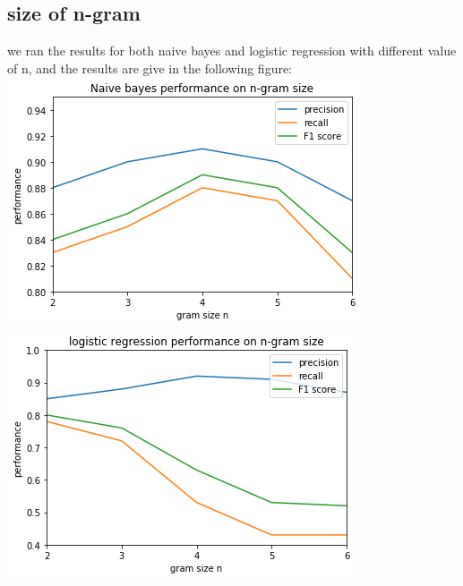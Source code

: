 \documentclass[11pt]{article}
\begin{document}
\subsection{size of n-gram}
we ran the results for both naive bayes and logistic regression with different value of n, and the results are give in the following figure:\\
\includegraphics[scale=0.6]{naive.png} \\
\includegraphics[scale=0.6]{logistic.png} 
\end{document}
